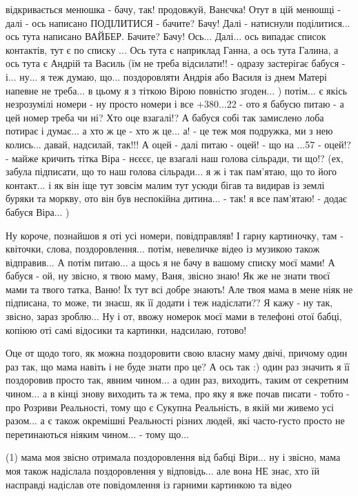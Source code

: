 відкривається менюшка - бачу, так!  продовжуй, Ванєчка! Отут в цій менюшці -
далі - ось написано ПОДІЛИТИСЯ - бачите? Бачу!  Далі - натиснули поділитися...
ось тута написано ВАЙБЕР. Бачите? Бачу! Ось...  Далі... ось випадає список
контактів, тут є по списку ... Ось тута є наприклад Ганна, а ось тута Галина, а
ось тута є Андрій та Василь (їм не треба відсилати!! - одразу застерігає бабуся
- і... ну... я теж думаю, що... поздоровляти Андрія або Василя із днем Матері
напевне не треба... в цьому я з тіткою Вірою повністю згоден... ) потім... є
якісь незрозумілі номери - ну просто номери і все +380...22 - ото я бабусю
питаю - а цей номер треба чи ні? Хто оце взагалі!? А бабуся собі так замислено
лоба потирає і думає... а хто ж це - хто ж це... а! - це теж моя подружка, ми з
нею колись...  давай, надсилай, так!!!  А оцей - далі питаю - оцей! - що на
...57 - оцей!? - майже кричить тітка Віра - нєєєє, це взагалі наш голова
сільради, ти що!?  (ех, забула підписати, що то наш голова сільради... я ж і
так пам'ятаю, що то його контакт...  і як він іще тут зовсім малим тут усюди
бігав та видирав із землі буряки та моркву, ото він був неспокійна дитина... -
так! я все пам'ятаю! - додає бабуся Віра... )

Ну короче, познайшов я оті усі номери, повідправляв! І гарну картиночку, там -
квіточки, слова, поздоровлення...  потім, невеличке відео із музикою також
відправив... А потім питаю... а щось я не бачу в вашому списку моєї мами!  А
бабуся - ой, ну звісно, я твою маму, Ваня, звісно знаю! Як же не знати твоєї
мами та твого татка, Ваню! Їх тут всі добре знають!  Але твоя мама в мене ніяк
не підписана, то може, ти знаєш, як її додати і теж надіслати?? Я кажу - ну
так, звісно, зараз зроблю... Ну і от, ввожу номерок моєї мами в телефоні отої
бабці, копіюю оті самі відосики та картинки, надсилаю, готово! 

Оце от щодо того, як можна поздоровити свою власну маму двічі, причому один раз
так, що мама навіть і не буде знати про це? А ось так :) один раз значить я її
поздоровив просто так, явним чином...  а один раз, виходить, таким от секретним
чином... а в кінці знову виходить та ж тема, про яку я вже почав писати - тобто
- про Розриви Реальності, тому що є Сукупна Реальність, в якій ми живемо усі
разом... а є також окремішні Реальності різних людей, які часто-густо просто не
перетинаються ніяким чином... - тому що... 

(1) мама моя звісно отримала поздоровлення від бабці Віри... ну і звісно, мама
моя також надіслала поздоровлення у відповідь... але вона НЕ знає, хто їй
насправді надіслав оте повідомлення із гарними картинкою та відео 

